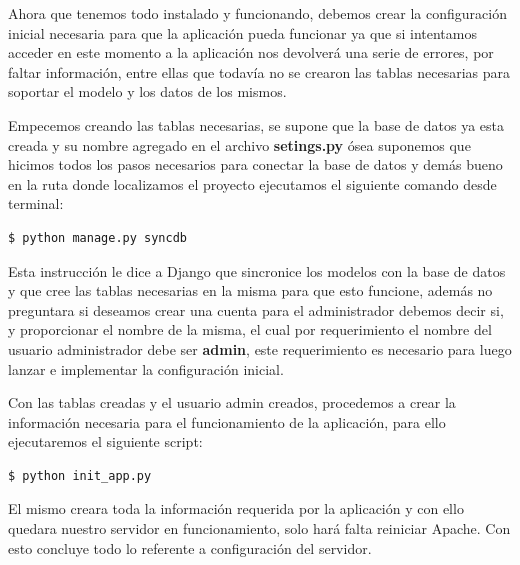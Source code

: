 Ahora que tenemos todo instalado y funcionando, debemos crear la configuración inicial necesaria para que la aplicación pueda funcionar ya que si intentamos acceder en este momento a la aplicación nos devolverá una serie de errores, por faltar información, entre ellas que todavía no se crearon las tablas necesarias para soportar el modelo y los datos de los mismos.

Empecemos creando las tablas necesarias, se supone que la base de datos ya esta creada y su nombre agregado en el archivo \textbf{setings.py} ósea suponemos que hicimos todos los pasos necesarios para conectar la base de datos y demás bueno en la ruta donde localizamos el proyecto ejecutamos el siguiente comando desde terminal:

\begin{lstlisting}[style=consola]
$ python manage.py syncdb
\end{lstlisting}

Esta instrucción le dice a Django que sincronice los modelos con la base de datos y que cree las tablas necesarias en la misma para que esto funcione, además no preguntara si deseamos crear una cuenta para el administrador debemos decir si, y proporcionar el nombre de la misma, el cual por requerimiento el nombre del usuario administrador debe ser \textbf{admin}, este requerimiento es necesario para luego lanzar e implementar la configuración inicial.

Con las tablas creadas y el usuario admin creados, procedemos a crear la información necesaria para el funcionamiento de la aplicación, para ello ejecutaremos el siguiente script:

\begin{lstlisting}[style=consola]
$ python init_app.py
\end{lstlisting}

El mismo creara toda la información requerida por la aplicación y con ello quedara nuestro servidor en funcionamiento, solo hará falta reiniciar Apache. Con esto concluye todo lo referente a configuración del servidor.











